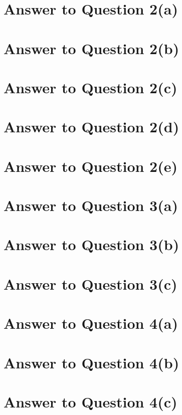 \documentclass[11pt]{article}
\begin{document}
\pagebreak[4]
\section*{Answer to Question 2(a)}


\pagebreak[4]
\section*{Answer to Question 2(b)}

\pagebreak[4]
\section*{Answer to Question 2(c)}

\pagebreak[4]
\section*{Answer to Question 2(d)}

\pagebreak[4]
\section*{Answer to Question 2(e)}

\pagebreak[4]
\section*{Answer to Question 3(a)}

\pagebreak[4]
\section*{Answer to Question 3(b)}

\pagebreak[4]
\section*{Answer to Question 3(c)}

\pagebreak[4]
\section*{Answer to Question 4(a)}

\pagebreak[4]
\section*{Answer to Question 4(b)}

\pagebreak[4]
\section*{Answer to Question 4(c)}
\end{document}
